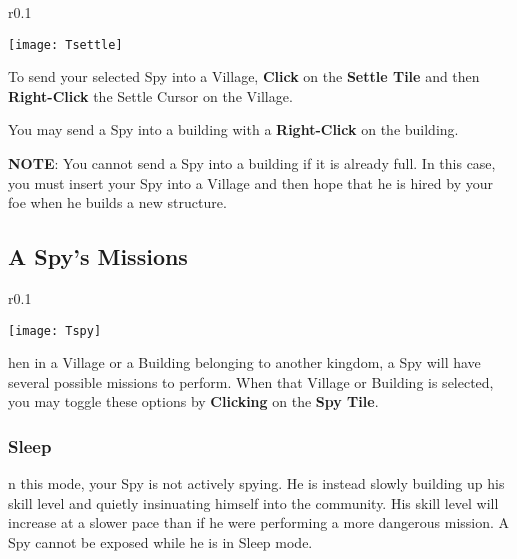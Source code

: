 \begin{wrapfigure}{r}{0.1\textwidth}
    \vspace{-20pt}
    \begin{center}
        \texttt{[image: Tsettle]}
    \end{center}
    \vspace{-20pt}
\end{wrapfigure}

To send your selected Spy into a Village, \textbf{Click} on the \textbf{Settle Tile} and then \textbf{Right-Click} the Settle Cursor on the Village.

You may send a Spy into a building with a \textbf{Right-Click} on the building.

\textbf{NOTE}: You cannot send a Spy into a building if it is already full. In this case, you must insert your Spy into a Village and then hope that he is hired by your foe when he builds a new structure.

\subsection{\textsf{A Spy’s Missions}}


\begin{wrapfigure}{r}{0.1\textwidth}
    \vspace{-20pt}
    \begin{center}
        \texttt{[image: Tspy]}
    \end{center}
    \vspace{-20pt}
\end{wrapfigure}

hen in a Village or a Building belonging to another kingdom, a Spy will have several possible missions to perform. When that Village or Building is selected, you may toggle these options by \textbf{Clicking} on the \textbf{Spy Tile}.

\subsubsection{\textsf{Sleep}}


n this mode, your Spy is not actively spying. He is instead slowly building up his skill level and quietly insinuating himself into the community. His skill level will increase at a slower pace than if he were performing a more dangerous mission. A Spy cannot be exposed while he is in Sleep mode.

